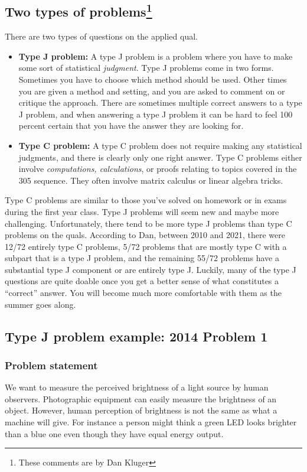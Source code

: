 \subsection{Two types of problems\footnote{These comments are by Dan Kluger}}

There are two types of questions on the applied qual.

\begin{itemize}
	\item \textbf{Type J problem:} A type J  problem is a problem where you have to make some sort of statistical \textit{judgment}. Type J problems come in two forms. Sometimes you have to choose which method should be used. Other times you are given a method and setting, and you are asked to comment on or critique the approach. There are sometimes multiple correct answers to a type J problem, and when answering a type J problem it can be hard to feel 100 percent certain that you have the answer they are looking for.
	\item 
	\textbf{Type C problem:} A type C problem does not require making any statistical judgments, and there is clearly only one right answer. Type C problems either involve \textit{computations, calculations}, or proofs relating to topics covered in the 305 sequence. They often involve matrix calculus or linear algebra tricks. 
\end{itemize}

Type C problems are similar to those you've solved on homework or in exams during the first year class. Type J problems will seem new and maybe more challenging. Unfortunately, there tend to be more type J problems than type C problems on the quals. According to Dan, between 2010 and 2021, there were 12/72 entirely type C problems, 5/72 problems that are mostly type C with a subpart that is a type J problem, and the remaining 55/72 problems have a substantial type J component or are entirely type J. Luckily, many of the type J questions are quite doable once you get a better sense of what constitutes a ``correct'' answer. You will become much more comfortable with them as the summer goes along.

\subsection{Type J problem example: 2014 Problem 1}\label{sec:case_study_1}

\subsubsection*{Problem statement}
We want to measure the perceived brightness of a light source by human
observers. Photographic equipment can easily measure the brightness of an
object. However, human perception of brightness is not the same as what
a machine will give. For instance a person might think a green LED looks
brighter than a blue one even though they have equal energy output.

